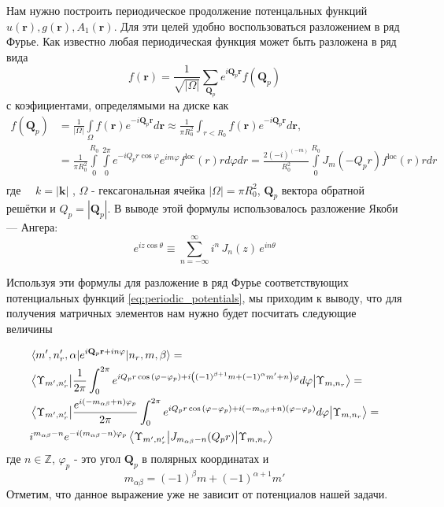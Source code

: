 \documentclass[a4paper,article,14pt]{extarticle}
\begin{document}
Нам нужно построить периодическое продолжение потенцальных функций $u(\mathbf{r}), g(\mathbf{r}), A_1(\mathbf{r})$. Для эти целей удобно воспользоваться разложением в ряд Фурье. Как известно любая периодическая функция может быть разложена в ряд вида
$$f (\mathbf{r}) = \frac{1}{\sqrt{|\Omega|}} \sum\limits_{\mathbf{Q}_p} e^{i \mathbf{Q}_p  \mathbf{r}} f(\mathbf{Q}_p) $$
с коэфициентами, определямыми на диске как
\begin{equation}
\begin{aligned}
f (\mathbf{Q}_p) &= \frac{1} {|\Omega|} \int\limits_\Omega f (  \mathbf{r} ) e^{- i \mathbf{Q}_p \mathbf{r}} d \mathbf{r} \approx \frac{1}{\pi R_0^2}  \int_{r<R_{0}}  f(\mathbf{r})   e^{-i\mathbf{Q}_p  \mathbf{r}}  d \mathbf{r} , \\
&   =\frac{1}{\pi R_0^2}  \int\limits_{0}^{R_0}  \int\limits_{0}^{2 \pi} e^{-i Q_p r \cos{\varphi}} e^{i m \varphi} f^{\text{loc}}(r) r d\varphi dr =\frac{2 (-i)^{(-m)}}{R_0^2}  \int\limits_{0}^{R_0}  J_{m} (-Q_p r ) f^{\text{loc}}(r) r dr     \\
\end{aligned}
\end{equation} 
где $\quad k = \left|\mathbf{k}\right| $ ,
$\Omega$ - гексагональная ячейка $|\Omega| = \pi R_0^2$, $\mathbf{Q}_p$ вектора обратной решётки и $Q_p=|\mathbf{Q}_p|$. В выводе этой формулы использовалось разложение Якоби — Ангера:
$$
e^{i z \cos \theta} \equiv \sum_{n=-\infty}^{\infty} i^n\, J_n(z)\, e^{i n \theta}
$$

Используя эти формулы для разложение в ряд Фурье соответствующих потенциальных функций \eqref{eq:periodic_potentials}, мы приходим к выводу, что для получения матричных элементов нам нужно будет посчитать следующие величины

\begin{equation}
\label{eq:matrix_elem_k}
\begin{aligned}
&\mel{m', n'_r, \alpha} {e^{i \mathbf{Q}_p\mathbf{r} + i n \varphi} } {n_r,m, \beta} = \\ &\mel{\Upsilon_{m', n'_r}} {\frac{1}{2 \pi}\int _{0}^{ 2 \pi } e^{i Q_p r \cos{\left( \varphi - \varphi_p  \right)} + i \left((-1)^{\beta+1}m + (-1)^{\alpha} m'  + n \right)  \varphi}    d\varphi} {\Upsilon_{m, n_r}} =  \\
& \mel{\Upsilon_{m', n'_r}} {\frac{  e^{i \left(-m_{\alpha \beta}  + n \right)  \varphi_p}}{2 \pi}\int _{0}^{ 2 \pi } e^{i Q_p r \cos{\left( \varphi - \varphi_p  \right)} + i \left(-m_{\alpha \beta}  + n \right)  (\varphi-\varphi_p) }    d\varphi} {\Upsilon_{m, n_r}} =\\
& i^{m_{\alpha \beta} - n} e^{-i (m_{\alpha \beta} - n)  \varphi_p}  \mel{\Upsilon_{m', n'_r}} {J_{m_{\alpha \beta} - n } (Q_p r) }{\Upsilon_{m, n_r}}
\end{aligned}
\end{equation}
где $n \in\mathbb{Z}$, $\varphi_p$ - это угол $\mathbf{Q}_p$ в полярных координатах и 
\begin{equation}
\label{eq:m_alpha_beta}
m_{\alpha \beta} = (-1)^{\beta}m + (-1)^{\alpha+1} m'
\end{equation}
Отметим, что данное выражение уже не зависит от потенциалов нашей задачи.
\end{document}
